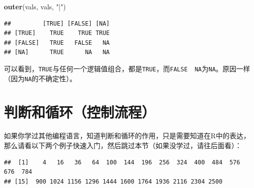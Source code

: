 \documentclass[]{book}
\newenvironment{Shaded}{\begin{snugshade}}{\end{snugshade}}
\newcommand{\CommentTok}[1]{\textcolor[rgb]{0.56,0.35,0.01}{\textit{#1}}}
\newcommand{\ControlFlowTok}[1]{\textcolor[rgb]{0.13,0.29,0.53}{\textbf{#1}}}
\newcommand{\DecValTok}[1]{\textcolor[rgb]{0.00,0.00,0.81}{#1}}
\newcommand{\KeywordTok}[1]{\textcolor[rgb]{0.13,0.29,0.53}{\textbf{#1}}}
\newcommand{\NormalTok}[1]{#1}
\newcommand{\OperatorTok}[1]{\textcolor[rgb]{0.81,0.36,0.00}{\textbf{#1}}}
\newcommand{\StringTok}[1]{\textcolor[rgb]{0.31,0.60,0.02}{#1}}
\begin{document}
\begin{Shaded}
\begin{Highlighting}[]
\KeywordTok{outer}\NormalTok{(vals, vals, }\StringTok{"|"}\NormalTok{)}
\end{Highlighting}
\end{Shaded}

\begin{verbatim}
##         [TRUE] [FALSE] [NA]
## [TRUE]    TRUE    TRUE TRUE
## [FALSE]   TRUE   FALSE   NA
## [NA]      TRUE      NA   NA
\end{verbatim}

可以看到，\texttt{TRUE}与任何一个逻辑值组合，都是\texttt{TRUE}，而\texttt{FALSE\ \textbar{}\ NA}为\texttt{NA}。原因一样（因为\texttt{NA}的不确定性）。

\section{判断和循环（控制流程）}

如果你学过其他编程语言，知道判断和循环的作用，只是需要知道在R中的表达，那么请看以下两个例子快速入门，然后跳过本节（如果没学过，请往后面看）：

\begin{Shaded}
\end{Shaded}

\begin{verbatim}
##  [1]    4   16   36   64  100  144  196  256  324  400  484  576  676  784
## [15]  900 1024 1156 1296 1444 1600 1764 1936 2116 2304 2500
\end{verbatim}
\end{document}
